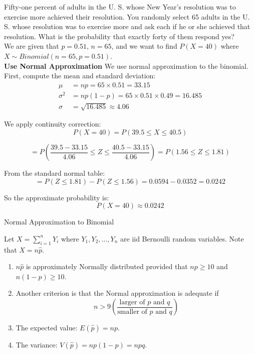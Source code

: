 \begin{example}


Fifty-one percent of adults in the U. S. whose New Year’s resolution was to exercise more achieved their resolution. You randomly select 65 adults in the U. S. whose resolution was to exercise more and ask each if he or she achieved that resolution. What is the probability that exactly forty of them respond yes?\\

We are given that $p = 0.51$, $n = 65$, and we want to find $P(X = 40)$ where $X \sim Binomial(n = 65, p = 0.51)$.\\

\textbf{Use Normal Approximation}
\vspace{0.5 em}
We use normal approximation to the binomial. First, compute the mean and standard deviation:
\begin{align*}
\mu &= np = 65 \times 0.51 = 33.15 \\
\sigma^2 &= np(1-p) = 65 \times 0.51 \times 0.49 = 16.485 \\
\sigma &= \sqrt{16.485} \approx 4.06
\end{align*}


We apply continuity correction:
\[
P(X = 40) = P(39.5 \leq X \leq 40.5)
\]

\[
= P\left(\frac{39.5 - 33.15}{4.06} \leq Z \leq \frac{40.5 - 33.15}{4.06}\right) = P(1.56 \leq Z \leq 1.81)
\]

From the standard normal table:
\[
= P(Z \leq 1.81) - P(Z \leq 1.56) = 0.0594 - 0.0352 = 0.0242
\]

So the approximate probability is:
\[
P(X = 40) \approx 0.0242
\]
\end{example}
\vspace{1em}
\begin{frame}{Normal Approximation to Binomial}

Let $X = \sum_{i=1}^{n} Y_i$ where $Y_1, Y_2, \ldots, Y_n$ are iid Bernoulli random variables. Note that $X = n\hat{p}$.

\begin{enumerate}
    \item $n\hat{p}$ is approximately Normally distributed provided that $np \geq 10$ and $n(1 - p) \geq 10$.

    \item Another criterion is that the Normal approximation is adequate if
    \[
    n > 9 \left( \frac{\text{larger of $p$ and $q$}}{\text{smaller of $p$ and $q$}} \right)
    \]

    \item The expected value: $E(\hat{p}) = np$.

    \item The variance: $V(\hat{p}) = np(1 - p) = npq$.
\end{enumerate}

\end{frame}

\vspace{1\baselineskip}  %





